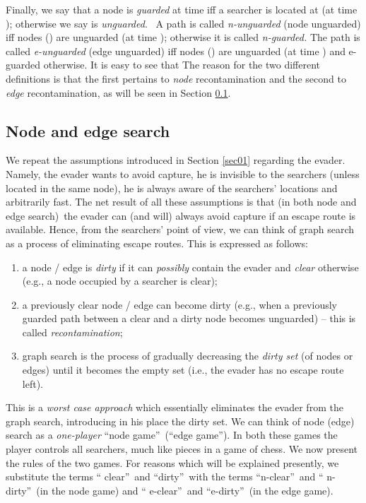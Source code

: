 \documentclass[11pt]{article}\usepackage{amsmath}
\begin{document}
Finally, we say that a node  is \emph{guarded} at time  iff a searcher
is located at  (at time ); otherwise we say  is \emph{unguarded}. \ A
path  is called \emph{n-unguarded }(node unguarded) iff
nodes  () are unguarded (at time ); otherwise it is
called \emph{n-guarded.} The path is called \emph{e-unguarded }(edge
unguarded) iff nodes  () are unguarded (at time ) and
e-guarded otherwise. It is easy to see that
The reason for the two different definitions is that the first pertains to
\emph{node} recontamination and the second to \emph{edge }recontamination, as
will be seen in Section \ref{sec0202}.

\subsection{Node and edge search}

\label{sec0202}

We repeat the assumptions introduced in Section \ref{sec01} regarding the
evader. Namely, the evader wants to avoid capture, he is invisible to the
searchers (unless located in the same node), he is always aware of the
searchers' locations and arbitrarily fast. The net result of all these
assumptions is that (in both node and edge search)\ the evader can (and will)
always avoid capture if an escape route is available. Hence, from the
searchers' point of view, we can think of graph search as a process of
eliminating escape routes. This is expressed as follows:\ 

\begin{enumerate}
\item a node / edge is \emph{dirty} if it can \emph{possibly} contain the
evader and \emph{clear} otherwise (e.g., a node occupied by a searcher is clear);

\item a previously clear node / edge can become dirty (e.g., when a previously
guarded path between a clear and a dirty node becomes unguarded) -- this is
called \emph{recontamination};

\item graph search is the process of gradually decreasing the \emph{dirty set}
(of nodes or edges) until it becomes the empty set (i.e., the evader has no
escape route left).
\end{enumerate}

This is a \emph{worst case approach }which essentially eliminates the evader
from the graph search, introducing in his place the dirty set. We can think of
node (edge) search as a \emph{one-player} \textquotedblleft node
game\textquotedblright\ (\textquotedblleft edge game\textquotedblright). In
both these games the player controls all searchers, much like pieces in a game
of chess. We now present the rules of the two games. For reasons which will be
explained presently, we substitute the terms \textquotedblleft
clear\textquotedblright\ and \textquotedblleft dirty\textquotedblright\ with
the terms \textquotedblleft n-clear\textquotedblright\ and \textquotedblleft
n-dirty\textquotedblright\ (in the node game) and \textquotedblleft
e-clear\textquotedblright\ and \textquotedblleft e-dirty\textquotedblright \ (in the edge game).
\end{document}
